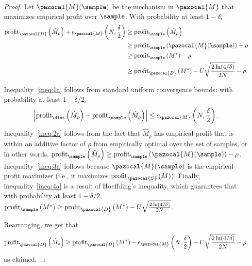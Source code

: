 \begin{proof}
Let $\pazocal{M}(\sample)$ be the mechanism in $\pazocal{M}$ that maximizes empirical profit over $\sample$. With probability at least $1-\delta$,
\begin{align}
 {\normalfont \profit}_{\pazocal{D}}\left(\hat{M}_{\rho}\right) + \epsilon_{\pazocal{M}}\left(N, \frac{\delta}{2}\right) &\geq   {\normalfont \profit}_{\sample}\left(\hat{M}_{\rho}\right)\label{ineq:1a} \\
&\geq {\normalfont \profit}_{\sample}\left(\pazocal{M}(\sample)\right) - \rho\label{ineq:2a}\\ 
&\geq  {\normalfont \profit}_{\sample}\left({M^*}\right) - \rho\label{ineq:3a} \\
& \geq {\normalfont \profit}_{\pazocal{D}}\left({M^*}\right) -  U \sqrt{\frac{2\ln(4/\delta)}{2N}}-\rho.\label{ineq:4a}
\end{align}


Inequality~\eqref{ineq:1a} follows from standard uniform convergence bounds: with probability at least $1-\delta/2$, \[\left|{\normalfont \profit}_{\dist}\left(\hat{M}_{\rho}\right) - {\normalfont \profit}_{\sample}\left(\hat{M}_{\rho}\right)\right| \leq \epsilon_{\pazocal{M}}\left(N, \frac{\delta}{2}\right).\] Inequality~\eqref{ineq:2a} follows from the fact that $\hat{M}_{\rho}$ has empirical profit that is within an additive factor of $\rho$ from empirically optimal over the set of samples, or in other words, ${\normalfont \profit}_\sample\left(\hat{M}_{\rho}\right) \geq {\normalfont \profit}_\sample\left(\pazocal{M}(\sample)\right) - \rho$.  Inequality~\eqref{ineq:3a} follows because $\pazocal{M}(\sample)$ is the empirical profit maximizer (i.e., it maximizes ${\normalfont \profit}_\pazocal{S}\left(M\right)$). Finally, inequality~\eqref{ineq:4a} is a result of Hoeffding's inequality, which guarantees that with probability at least $1-\delta/2$, ${\normalfont \profit}_{\sample}\left(M^*\right) \geq {\normalfont \profit}_{\pazocal{D}}\left(M^*\right) -  U \sqrt{\frac{2\ln(4/\delta)}{2N}}$.

Rearranging, we get that \[ {\normalfont \profit}_{\pazocal{D}}\left(\hat{M}_{\rho}\right) \geq {\normalfont \profit}_{\pazocal{D}}\left(M^*\right) - \epsilon_{\pazocal{M}}\left(N, \frac{\delta}{2}\right) - U \sqrt{\frac{2\ln(4/\delta)}{2N}} - \rho,\] as claimed.
\end{proof}

